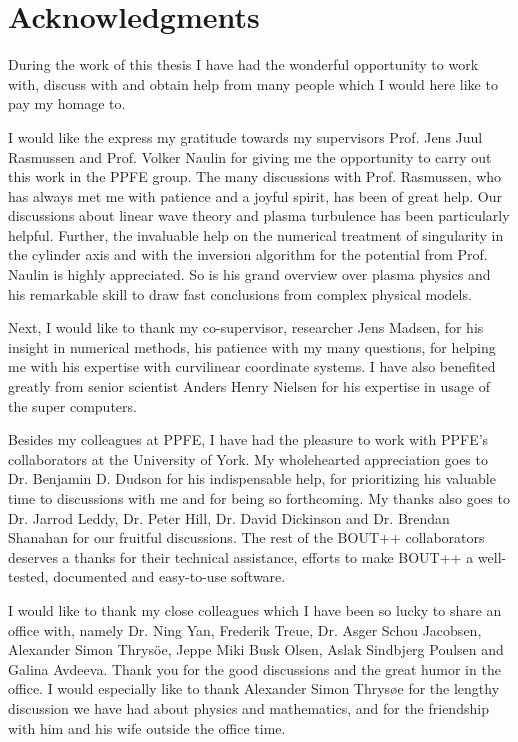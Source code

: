 \chapter*{Acknowledgments}
%
During the work of this thesis I have had the wonderful opportunity to work with, discuss with and obtain help from many people which I would here like to pay my homage to.

I would like the express my gratitude towards my supervisors Prof. Jens Juul Rasmussen and Prof. Volker Naulin for giving me the opportunity to carry out this work in the PPFE group.
The many discussions with Prof. Rasmussen, who has always met me with patience and a joyful spirit, has been of great help.
Our discussions about linear wave theory and plasma turbulence has been particularly helpful.
Further, the invaluable help on the numerical treatment of singularity in the cylinder axis and with the inversion algorithm for the potential from Prof. Naulin is highly appreciated.
So is his grand overview over plasma physics and his remarkable skill to draw fast conclusions from complex physical models.

Next, I would like to thank my co-supervisor, researcher Jens Madsen, for his insight in numerical methods, his patience with my many questions, for helping me with his expertise with curvilinear coordinate systems.
I have also benefited greatly from senior scientist Anders Henry Nielsen for his expertise in usage of the super computers.

Besides my colleagues at PPFE, I have had the pleasure to work with PPFE's collaborators at the University of York.
My wholehearted appreciation goes to Dr. Benjamin D. Dudson for his indispensable help, for prioritizing his valuable time to discussions with me and for being so forthcoming.
My thanks also goes to Dr. Jarrod Leddy, Dr. Peter Hill, Dr. David Dickinson and Dr. Brendan Shanahan for our fruitful discussions.
The rest of the BOUT++ collaborators deserves a thanks for their technical assistance, efforts to make BOUT++ a well-tested, documented and easy-to-use software.

I would like to thank my close colleagues which I have been so lucky to share an office with, namely Dr. Ning Yan, Frederik Treue, Dr. Asger Schou Jacobsen, Alexander Simon Thrys{\"o}e, Jeppe Miki Busk Olsen, Aslak Sindbjerg Poulsen and Galina Avdeeva. Thank you for the good discussions and the great humor in the office.
I would especially like to thank Alexander Simon Thrys{\o}e for the lengthy discussion we have had about physics and mathematics, and for the friendship with him and his wife outside the office time.

